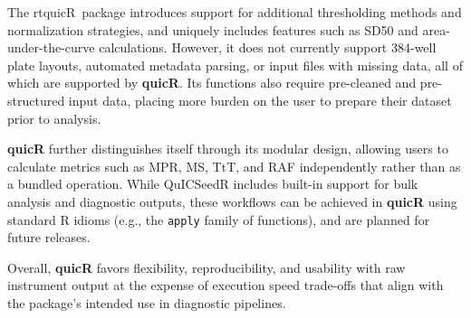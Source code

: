 \documentclass[preprint,12pt,a4paper]{elsarticle}
\begin{document}
            The rtquicR\ package introduces support for additional thresholding methods and normalization strategies, and uniquely includes features such as SD50 and area-under-the-curve calculations. However, it does not currently support 384-well plate layouts, automated metadata parsing, or input files with missing data, all of which are supported by \textbf{quicR}. Its functions also require pre-cleaned and pre-structured input data, placing more burden on the user to prepare their dataset prior to analysis.

            \textbf{quicR} further distinguishes itself through its modular design, allowing users to calculate metrics such as MPR, MS, TtT, and RAF independently rather than as a bundled operation. While QuICSeedR includes built-in support for bulk analysis and diagnostic outputs, these workflows can be achieved in \textbf{quicR} using standard R idioms (e.g., the \texttt{apply} family of functions), and are planned for future releases.

            Overall, \textbf{quicR} favors flexibility, reproducibility, and usability with raw instrument output at the expense of execution speed trade-offs that align with the package’s intended use in diagnostic pipelines.
\end{document}
